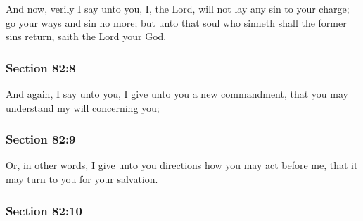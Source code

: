 		And now, verily I say unto you, I, the Lord, will not lay any sin to your charge; go your ways and sin no more; but unto that soul who sinneth shall the former sins return, saith the Lord your God.


	\subsubsection{Section 82:8} %
		\label{DC82-8}

		And again, I say unto you, I give unto you a new commandment, that you may understand my will concerning you;


	\subsubsection{Section 82:9} %
		\label{DC82-9}

		Or, in other words, I give unto you directions how you may act before me, that it may turn to you for your salvation.


	\subsubsection{Section 82:10} %
		\label{DC82-10}

